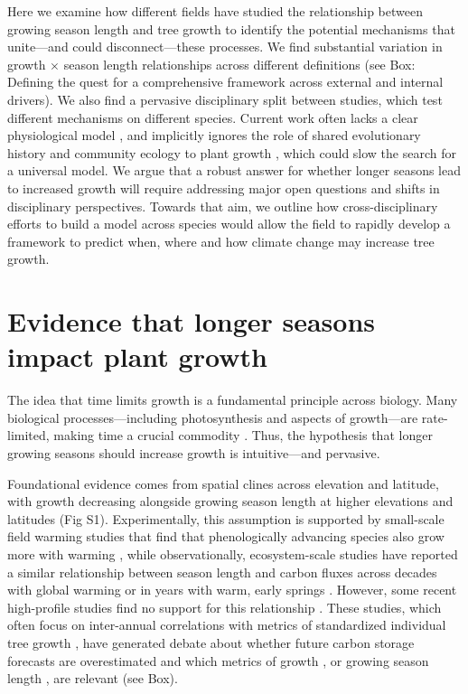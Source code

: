 \documentclass[11pt]{article}
\begin{document}
Here we examine how different fields have studied the relationship between growing season length and tree growth to identify the potential mechanisms that unite---and could disconnect---these processes. 
We find substantial variation in growth $\times$ season length relationships across different definitions (see Box: Defining the quest for a comprehensive framework across external and internal drivers). We also find a pervasive disciplinary split between studies, which test different mechanisms on different species. Current work often lacks a clear physiological model \citep{korner2015paradigm,fatichi2019modelling}, and implicitly ignores the role of shared evolutionary history and community ecology to plant growth \citep[e.g.][]{Grime:1977sw,Webb:2002or,avila2023evidence}, which could slow the search for a universal model. We argue that a robust answer for whether longer seasons lead to increased growth will require addressing major open questions and shifts in disciplinary perspectives. Towards that aim, we outline how cross-disciplinary efforts to build a model across species would allow the field to rapidly develop a framework to predict when, where and how climate change may increase tree growth. 

\section*{Evidence that longer seasons impact plant growth} %
The idea that time limits growth is a fundamental principle across biology. Many biological processes---including photosynthesis and aspects of growth---are rate-limited, making time a crucial commodity \citep{nobel1983biophysical,cosgrove2005growth,hilty2021plant}. Thus, the hypothesis that longer growing seasons should increase growth is intuitive---and pervasive. 

Foundational evidence comes from spatial clines across elevation and latitude, with growth decreasing alongside growing season length at higher elevations and latitudes (Fig S1). Experimentally, this assumption is supported by small-scale field warming studies that find that phenologically advancing species also grow more with warming \citep[][]{Cleland:2012}, while observationally, ecosystem-scale studies have reported a similar relationship between season length and carbon fluxes across decades with global warming \citep{keenan2014net} or in years with warm, early springs \citep{chen1999effects}. However, some recent high-profile studies find no support for this relationship \citep{dow2022warm}. These studies, which often focus on inter-annual correlations with metrics of standardized individual tree growth \citep{dow2022warm,silvestro2023longer}, have generated debate about whether future carbon storage forecasts are overestimated and which metrics of growth \citep{green2022limits}, or growing season length \citep{korner2023four}, are relevant (see Box).
\end{document}
